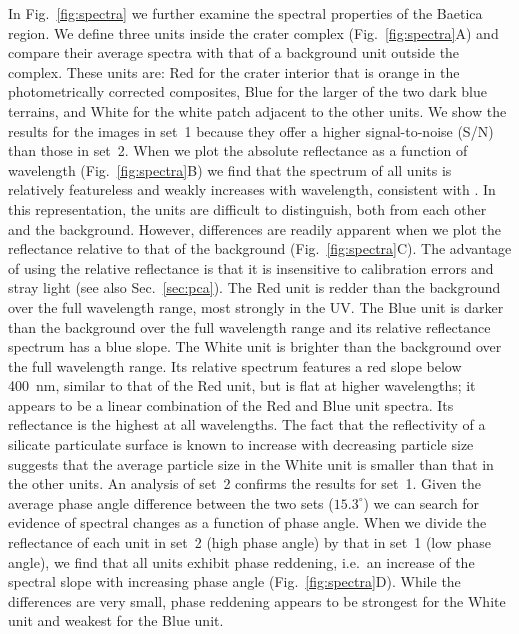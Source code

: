 \documentclass[3p,authoryear]{elsarticle}
\begin{document}
In Fig.~\ref{fig:spectra} we further examine the spectral properties of the Baetica region. We define three units inside the crater complex (Fig.~\ref{fig:spectra}A) and compare their average spectra with that of a background unit outside the complex. These units are: Red for the crater interior that is orange in the photometrically corrected composites, Blue for the larger of the two dark blue terrains, and White for the white patch adjacent to the other units. We show the results for the images in set~1 because they offer a higher signal-to-noise (S/N) than those in set~2. When we plot the absolute reflectance as a function of wavelength (Fig.~\ref{fig:spectra}B) we find that the spectrum of all units is relatively featureless and weakly increases with wavelength, consistent with \citet{Mg12}. In this representation, the units are difficult to distinguish, both from each other and the background. However, differences are readily apparent when we plot the reflectance relative to that of the background (Fig.~\ref{fig:spectra}C). The advantage of using the relative reflectance is that it is insensitive to calibration errors and stray light (see also Sec.~\ref{sec:pca}). The Red unit is redder than the background over the full wavelength range, most strongly in the UV. The Blue unit is darker than the background over the full wavelength range and its relative reflectance spectrum has a blue slope. The White unit is brighter than the background over the full wavelength range. Its relative spectrum features a red slope below 400~nm, similar to that of the Red unit, but is flat at higher wavelengths; it appears to be a linear combination of the Red and Blue unit spectra. Its reflectance is the highest at all wavelengths. The fact that the reflectivity of a silicate particulate surface is known to increase with decreasing particle size \citep{AF67} suggests that the average particle size in the White unit is smaller than that in the other units. An analysis of set~2 confirms the results for set~1. Given the average phase angle difference between the two sets ($15.3^\circ$) we can search for evidence of spectral changes as a function of phase angle. When we divide the reflectance of each unit in set~2 (high phase angle) by that in set~1 (low phase angle), we find that all units exhibit phase reddening, i.e.\ an increase of the spectral slope with increasing phase angle (Fig.~\ref{fig:spectra}D). While the differences are very small, phase reddening appears to be strongest for the White unit and weakest for the Blue unit.
\end{document}
